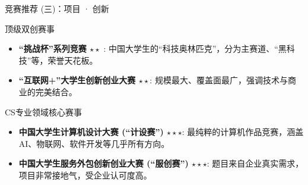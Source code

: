 \documentclass{beamer}
\begin{document}
\begin{frame}{竞赛推荐 (三)：项目 · 创新}
    \begin{center}
        \huge 顶级双创赛事
    \end{center}
    \begin{itemize}
        \item \textbf{“挑战杯”系列竞赛 $\star \star$ }: \small 中国大学生的“科技奥林匹克”，分为主赛道、“黑科技”等，荣誉天花板。
        \item \textbf{“互联网+”大学生创新创业大赛 $\star \star$}: \small 规模最大、覆盖面最广，强调\alert{技术与商业的完美结合}。
    \end{itemize}

    \vfill
    
    \begin{center}
        \huge CS专业领域核心赛事
    \end{center}
    \begin{itemize}
        \item \textbf{中国大学生计算机设计大赛 (“计设赛”) $\star \star \star$}: \small 最纯粹的计算机作品竞赛，涵盖AI、物联网、软件开发等几乎所有方向。
        \item \textbf{中国大学生服务外包创新创业大赛 (“服创赛”) $\star \star \star$}: \small 题目来自\alert{企业真实需求}，项目非常接地气，受企业认可度高。
    \end{itemize}
\end{frame}
\end{document}
